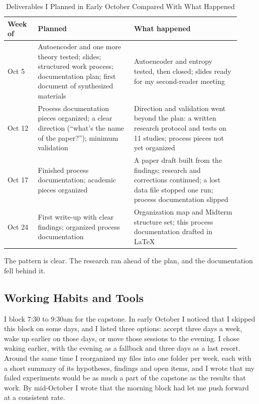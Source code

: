 \begin{table}[htbp]
\caption{Deliverables I Planned in Early October Compared With What Happened}
\label{tab:planactual}
\small
\begin{tabular}{p{0.12\linewidth}p{0.38\linewidth}p{0.42\linewidth}}
\hline
Week of & Planned & What happened \\
\hline
Oct 5 & Autoencoder and one more theory tested; slides; structured work process; documentation plan; first document of synthesized materials & Autoencoder and entropy tested, then closed; slides ready for my second-reader meeting \\
Oct 12 & Process documentation pieces organized; a clear direction (``what's the name of the paper?''); minimum validation & Direction and validation went beyond the plan: a written research protocol and tests on 11 studies; process pieces not yet organized \\
Oct 17 & Finished process documentation; academic pieces organized & A paper draft built from the findings; research and corrections continued; a lost data file stopped one run; process documentation slipped \\
Oct 24 & First write-up with clear findings; organized process documentation & Organization map and Midterm structure set; this process documentation drafted in LaTeX \\
\hline
\end{tabular}
\end{table}

The pattern is clear. The research ran ahead of the plan, and the documentation fell behind it. 

\subsection{Working Habits and Tools}

I block 7:30 to 9:30am for the capstone. In early October I noticed that I skipped this block on some days, and I listed three options: accept three days a week, wake up earlier on those days, or move those sessions to the evening. I chose waking earlier, with the evening as a fallback and three days as a last resort. Around the same time I reorganized my files into one folder per week, each with a short summary of its hypotheses, findings and open items, and I wrote that my failed experiments would be as much a part of the capstone as the results that work. By mid-October I wrote that the morning block had let me push forward at a consistent rate.

